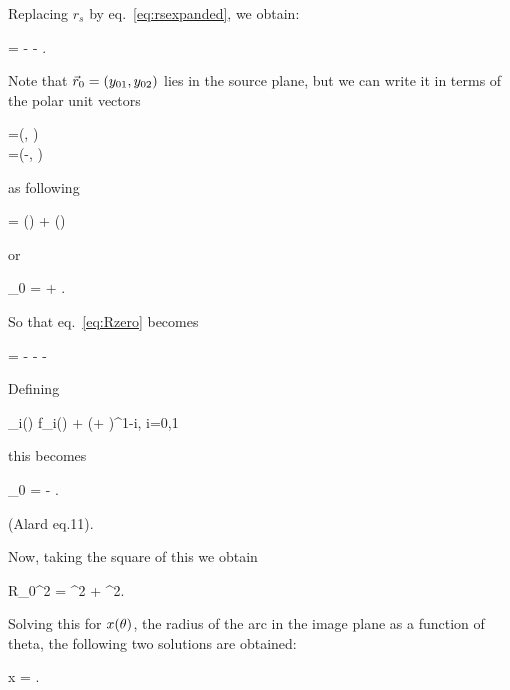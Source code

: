 Replacing $r_s$ by eq.~\eqref{eq:rsexpanded}, we obtain:

\beq
\label{eq:Rzero}
 =  - 
 \hat{\theta} - . \;\;\;
\eeq


Note that $\vec{r}_{0} = (y_{01},y_{02})$ lies in the source plane, but we
can write it in terms of the polar unit vectors

\bea
\label{eq:unitvs}
=(\cos\te, \sin \te) \\
\hat{\theta}=(-\sin \te, \cos \te)
\eea

 as following

\beq
\vecrz = (\vecrz \cdot \hatth) \hatth + (\vecrz \cdot \hatr) \hatr
\eeq

or


\beq
\label{eq:rzero}
_{0} = \left[ \yone \,  \cos \te + \ytwo \,  \sin \te \right]  +
\left[ -\yone \,  \sin \te + \ytwo \,  \cos \te \right] \hat{\theta}.  \;\;\;
\eeq

So that eq.~\eqref{eq:Rzero} becomes

\beq
{} =  - 
 \hat{\theta} -  \left[ \yone \, 
\cos \te + \ytwo \,  \sin \te \right]  - \left[ -\yone \,  \sin \te +
\ytwo \,  \cos \te \right] \hat{\theta} \;\;\;
\eeq


Defining

\beq
{}_i(\theta) \equiv f_i(\theta) + (\yone \cos \te + \ytwo \sin
\te)\re^{1-i}, \;\; i=0,1
\eeq

this becomes

\beq
{}_{0} =  -
 
\hat{\theta}. \;\;\; \label{eq:Alard11}
\eeq

(Alard eq.11).

Now, taking the square of this we obtain

\beq
R_{0}^2 = ^2 +
^2. \;\;\;
\eeq

Solving this for $x(\theta)$, the radius of the arc in the image plane as
a function of theta, the following two solutions are obtained:

\beq
\label{eq:xsoln}
x = . \;\;\;
\eeq

